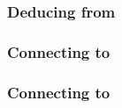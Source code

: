 \subsubsection{Deducing \opc{} from \pbcb{}}                       \label{rom: opcode: opcode from padded byte code byte}   
\subsubsection{Connecting \IP{} to \IRP{}}                         \label{rom: opcode: is push from decoded}                
\subsubsection{Connecting \ISVALIDJUMPDESTINATION{} to \IRJD{}}    \label{rom: opcode: is jumpdest from decoded}            
